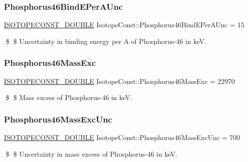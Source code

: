 \subsubsection{\texorpdfstring{Phosphorus46\+Bind\+E\+Per\+A\+Unc}{Phosphorus46BindEPerAUnc}}
{\footnotesize\ttfamily \mbox{\hyperlink{group___isotope_const-_macros_ga8f45a7272ce02c0b4c65c44636ed719a}{I\+S\+O\+T\+O\+P\+E\+C\+O\+N\+S\+T\+\_\+\+D\+O\+U\+B\+LE}} Isotope\+Const\+::\+Phosphorus46\+Bind\+E\+Per\+A\+Unc = 15}

\$ \$ Uncertainty in binding energy per A of Phosphorus-\/46 in keV. \mbox{\label{group___isotope_const-_phosphorus-_p46_ga08ab8cc97c8f9a12943cc1f3afdb7415}} 
\subsubsection{\texorpdfstring{Phosphorus46\+Mass\+Exc}{Phosphorus46MassExc}}
{\footnotesize\ttfamily \mbox{\hyperlink{group___isotope_const-_macros_ga8f45a7272ce02c0b4c65c44636ed719a}{I\+S\+O\+T\+O\+P\+E\+C\+O\+N\+S\+T\+\_\+\+D\+O\+U\+B\+LE}} Isotope\+Const\+::\+Phosphorus46\+Mass\+Exc = 22970}

\$ \$ Mass excess of Phosphorus-\/46 in keV. \mbox{\label{group___isotope_const-_phosphorus-_p46_gab9536ab89ca3ef44f7be25a671eca17e}} 
\subsubsection{\texorpdfstring{Phosphorus46\+Mass\+Exc\+Unc}{Phosphorus46MassExcUnc}}
{\footnotesize\ttfamily \mbox{\hyperlink{group___isotope_const-_macros_ga8f45a7272ce02c0b4c65c44636ed719a}{I\+S\+O\+T\+O\+P\+E\+C\+O\+N\+S\+T\+\_\+\+D\+O\+U\+B\+LE}} Isotope\+Const\+::\+Phosphorus46\+Mass\+Exc\+Unc = 700}

\$ \$ Uncertainty in mass excess of Phosphorus-\/46 in keV. \mbox{\label{group___isotope_const-_phosphorus-_p46_gaea86682d1ce0c34b25aa105fef1092ad}} 
